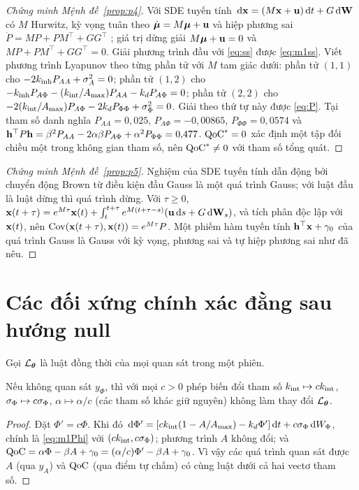 \begin{proof}[Chứng minh Mệnh đề~\ref{prop:p4}]
Với SDE tuyến tính $\,\mathrm{d}\mathbf{x}=(M\mathbf{x}+\mathbf{u})\,\mathrm{d} t+G\,\mathrm{d}\mathbf W$ có $M$ Hurwitz, kỳ vọng tuân theo $\dot{\boldsymbol{\mu}}=M\boldsymbol{\mu}+\mathbf{u}$ và hiệp phương sai $\dot P=MP+PM^\top+GG^\top$ \citep{Gardiner2009}; giá trị dừng giải $M\boldsymbol{\mu}+\mathbf{u}=0$ và $MP+PM^\top+GG^\top=0$. Giải phương trình đầu với \eqref{eq:ss} được \eqref{eq:m1ss}. Viết phương trình Lyapunov theo từng phần tử với $M$ tam giác dưới: phần tử $(1,1)$ cho $-2k_{\mathrm{inh}} P_{AA}+\sigma_{A}^2=0$; phần tử $(1,2)$ cho $-k_{\mathrm{inh}} P_{A\Phi}-(k_{\mathrm{int}}/A_{\max})P_{AA}-k_{d} P_{A\Phi}=0$; phần tử $(2,2)$ cho $-2(k_{\mathrm{int}}/A_{\max})P_{A\Phi}-2k_{d} P_{\Phi\Phi}+\sigma_{\Phi}^2=0$. Giải theo thứ tự này được \eqref{eq:P}. Tại tham số danh nghĩa $P_{AA}=0{,}025$, $P_{A\Phi}=-0{,}00865$, $P_{\Phi\Phi}=0{,}0574$ và $\mathbf{h}^\top P\mathbf{h}=\beta^2P_{AA}-2\alpha\beta P_{A\Phi}+\alpha^2P_{\Phi\Phi}=0{,}477$. $\mathrm{QoC}^*=0$ xác định một tập đối chiều một trong không gian tham số, nên $\mathrm{QoC}^*\neq0$ với tham số tổng quát.
\end{proof}

\begin{proof}[Chứng minh Mệnh đề~\ref{prop:p5}]
Nghiệm của SDE tuyến tính dẫn động bởi chuyển động Brown từ điều kiện đầu Gauss là một quá trình Gauss; với luật đầu là luật dừng thì quá trình dừng. Với $\tau\ge0$, $\mathbf{x}(t+\tau)=e^{M\tau}\mathbf{x}(t)+\int_t^{t+\tau}e^{M(t+\tau-s)}(\mathbf{u}\,\mathrm{d} s+G\,\mathrm{d}\mathbf W_s)$, và tích phân độc lập với $\mathbf{x}(t)$, nên $\operatorname{Cov}(\mathbf{x}(t+\tau),\mathbf{x}(t))=e^{M\tau}P$. Một phiếm hàm tuyến tính $\mathbf{h}^\top\mathbf{x}+\gamma_0$ của quá trình Gauss là Gauss với kỳ vọng, phương sai và tự hiệp phương sai như đã nêu.
\end{proof}

\section{Các đối xứng chính xác đằng sau hướng null}
\label{app:symmetry}

Gọi $\mathcal L_{\boldsymbol{\theta}}$ là luật đồng thời của mọi quan sát trong một phiên.

\begin{proposition}
Nếu không quan sát $y_\Phi$, thì với mọi $c>0$ phép biến đổi tham số $k_{\mathrm{int}}\mapsto ck_{\mathrm{int}}$, $\sigma_{\Phi}\mapsto c\sigma_{\Phi}$, $\alpha\mapsto\alpha/c$ (các tham số khác giữ nguyên) không làm thay đổi $\mathcal L_{\boldsymbol{\theta}}$.
\end{proposition}
\begin{proof}
Đặt $\Phi'=c\Phi$. Khi đó $\,\mathrm{d}\Phi'=[ck_{\mathrm{int}}(1-A/A_{\max})-k_{d}\Phi']\,\mathrm{d} t+c\sigma_{\Phi}\,\mathrm{d} W_\Phi$, chính là \eqref{eq:m1Phi} với $(ck_{\mathrm{int}},c\sigma_{\Phi})$; phương trình $A$ không đổi; và $\mathrm{QoC}=\alpha\Phi-\beta A+\gamma_0=(\alpha/c)\Phi'-\beta A+\gamma_0$. Vì vậy các quá trình quan sát được $A$ (qua $y_A$) và $\mathrm{QoC}$ (qua điểm tự chấm) có cùng luật dưới cả hai vectơ tham số.
\end{proof}


